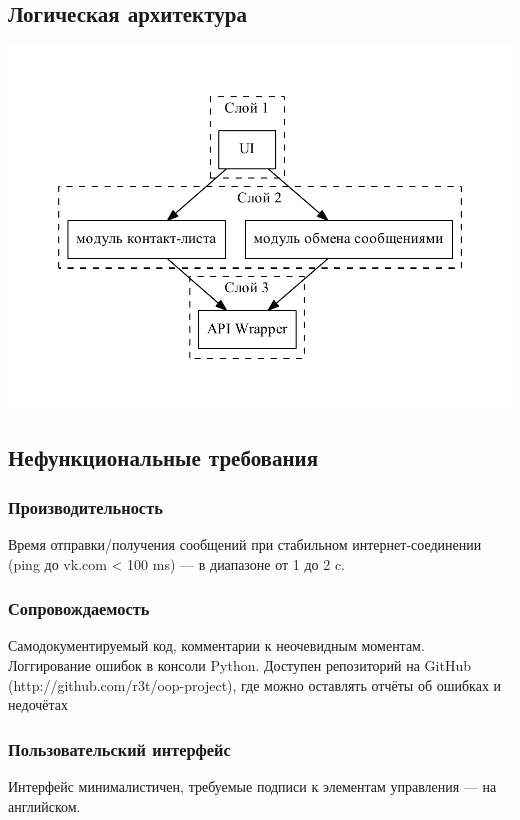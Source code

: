 \documentclass[12pt]{article}
\begin{document}
\subsection{Логическая архитектура}
\includegraphics{../HLA/diag/logic.pdf}

\subsection{Нефункциональные требования}

\subsubsection*{Производительность}
Время отправки/получения сообщений при стабильном интернет-соединении (ping до vk.com < 100 ms) — в диапазоне от 1 до 2 c.

\subsubsection{Сопровождаемость}
Самодокументируемый код, комментарии к неочевидным моментам. Логгирование ошибок в консоли Python. Доступен репозиторий на GitHub (http://github.com/r3t/oop-project), где можно оставлять отчёты об ошибках и недочётах

\subsubsection{Пользовательский интерфейс}
Интерфейс минималистичен, требуемые подписи к элементам управления — на английском.
\end{document}
